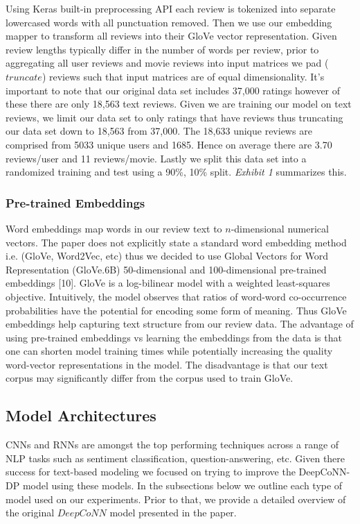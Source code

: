 \documentclass[10pt,twocolumn,letterpaper]{article}
\begin{document}
Using Keras built-in preprocessing API each review is tokenized into separate lowercased words with all punctuation removed. Then we use our embedding mapper to transform all reviews into their GloVe vector representation. Given review lengths typically differ in the number of words per review, prior to aggregating all user reviews and movie reviews into input matrices we pad ($truncate$) reviews such that input matrices are of equal dimensionality. It's important to note that our original data set includes 37,000 ratings however of these there are only 18,563 text reviews. Given we are training our model on text reviews, we limit our data set to only ratings that have reviews thus truncating our data set down to 18,563 from 37,000. The 18,633 unique reviews are comprised from 5033 unique users and 1685. Hence on average there are 3.70 reviews/user and 11 reviews/movie. Lastly we split this data set into a randomized training and test using a 90\%, 10\% split. \textit{Exhibit 1} summarizes this.
 
\subsubsection{Pre-trained Embeddings}

Word embeddings map words in our review text to $n$-dimensional numerical vectors. The paper does not explicitly state a standard word embedding method i.e. (GloVe, Word2Vec, etc) thus we decided to use Global Vectors for Word Representation (GloVe.6B) 50-dimensional and 100-dimensional pre-trained embeddings [10]. GloVe is a log-bilinear model with a weighted least-squares objective. Intuitively, the model observes that ratios of word-word co-occurrence probabilities have the potential for encoding some form of meaning. Thus GloVe embeddings help capturing text structure from our review data. The advantage of using pre-trained embeddings vs learning the embeddings from the data is that one can shorten model training times while potentially increasing the quality word-vector representations in the model. The disadvantage is that our text corpus may significantly differ from the corpus used to train GloVe. 

\subsection{Model Architectures}
CNNs and RNNs are amongst the top performing techniques across a range of NLP tasks such as sentiment classification, question-answering, etc. Given there success for text-based modeling we focused on trying to improve the DeepCoNN-DP model using these models. In the subsections below we outline each type of model used on our experiments. Prior to that, we provide a detailed overview of the original $DeepCoNN$ model presented in the paper. 
\end{document}
